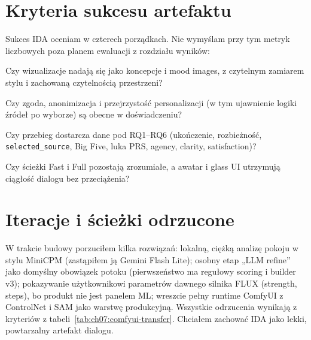 \section{Kryteria sukcesu artefaktu}
\label{ch07:sec:kryteria}

Sukces IDA oceniam w czterech porządkach. Nie wymyślam przy tym metryk liczbowych poza planem ewaluacji z rozdziału wyników:

\begin{description}[style=nextline]
  \item[Estetyczny]
    Czy wizualizacje nadają się jako koncepcje i mood images, z czytelnym zamiarem stylu i zachowaną czytelnością przestrzeni?
  \item[Etyczny]
    Czy zgoda, anonimizacja i przejrzystość personalizacji (w tym ujawnienie logiki źródeł po wyborze) są obecne w doświadczeniu?
  \item[Badawczy]
    Czy przebieg dostarcza dane pod RQ1--RQ6 (ukończenie, rozbieżność, \texttt{selected\_source}, Big Five, luka PRS, agency, clarity, satisfaction)?
  \item[Produktowy]
    Czy ścieżki Fast i Full pozostają zrozumiałe, a awatar i glass UI utrzymują ciągłość dialogu bez przeciążenia?
\end{description}

\section{Iteracje i ścieżki odrzucone}
\label{ch07:sec:iteracje}

W trakcie budowy porzuciłem kilka rozwiązań: lokalną, ciężką analizę pokoju w stylu MiniCPM (zastąpiłem ją Gemini Flash Lite); osobny etap „LLM refine” jako domyślny obowiązek potoku (pierwszeństwo ma regułowy scoring i builder v3); pokazywanie użytkownikowi parametrów dawnego silnika FLUX (strength, steps), bo produkt nie jest panelem ML; wreszcie pełny runtime ComfyUI z ControlNet i SAM jako warstwę produkcyjną.
Wszystkie odrzucenia wynikają z kryteriów z tabeli~\ref{tab:ch07:comfyui-transfer}. Chciałem zachować IDA jako lekki, powtarzalny artefakt dialogu.

